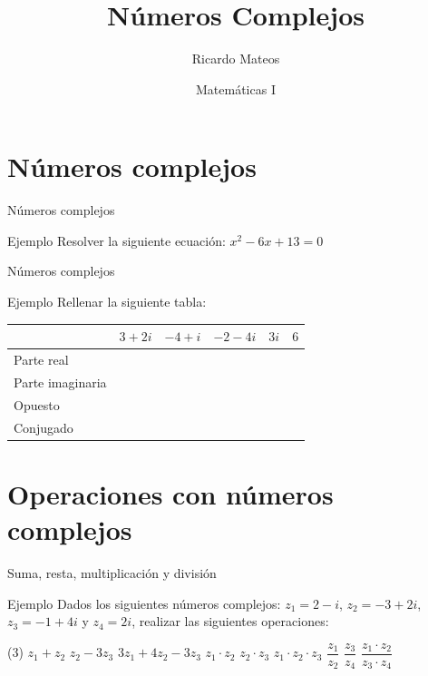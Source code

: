 \documentclass[8pt]{beamer}
\title{Números Complejos}
\author{Ricardo Mateos}
\institute[UHEI-IVED]{Departamento de Matemáticas \\ UHEI - IVED}
\date{Matemáticas I}
\begin{document}
\begin{frame}
\maketitle
\end{frame}

\begin{frame}
\tableofcontents
\end{frame}

\section{Números complejos}

\begin{frame}[t]{Números complejos}
\begin{exampleblock}{Ejemplo}
Resolver la siguiente ecuación: $x^2-6x+13=0$
\end{exampleblock}
\end{frame}

\begin{frame}{Números complejos}
\begin{exampleblock}{Ejemplo}
Rellenar la siguiente tabla:
\end{exampleblock}
\begin{tabular}{|p{3cm}|p{1cm}|p{1cm}|p{1cm}|p{1cm}|p{1cm}|}
\hline
& $3+2i$ & $-4+i$ & $-2-4i$ & $ 3i$ & $6 $  \\ \hline
Parte real & &  & & & \\ \hline
Parte imaginaria & & & & & \\ \hline
Opuesto & & & & &  \\ \hline
Conjugado  & & & & & \\ \hline
\end{tabular}

\end{frame}


\section{Operaciones con números complejos}
\begin{frame}[t]{Suma, resta, multiplicación y división}
\begin{exampleblock}{Ejemplo}
Dados los siguientes números complejos: $z_1= 2-i $, $z_ 2= -3+2i$, $z_3= -1+4i$ y $z_4=2i$, realizar las siguientes operaciones:
\begin{tasks}[label=\alph*)](3)
\task $z_1+z_2$
\task $z_2-3z_3$
\task $3z_1+4z_2- 3z_3$
\task $z_1\cdot z_2$
\task $z_2\cdot z_3$
\task $z_1\cdot z_2 \cdot z_3$
\task $\dfrac{z_1}{z_2}$
\task $\dfrac{z_3}{z_4}$
\task $ \dfrac{z_1 \cdot z_2}{z_3 \cdot z_4}$
\end{tasks}
\end{exampleblock}
\end{frame}
\end{document}
